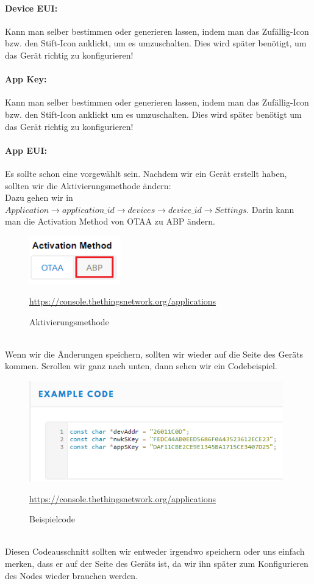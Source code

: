 \paragraph{Device EUI:} Kann man selber bestimmen oder generieren lassen, indem man das Zufällig-Icon bzw. den Stift-Icon anklickt, um es umzuschalten. Dies wird später benötigt, um das Gerät richtig zu konfigurieren!

\paragraph{App Key:} Kann man selber bestimmen oder generieren lassen, indem man das Zufällig-Icon bzw. den Stift-Icon anklickt um es umzuschalten. Dies wird später benötigt um das Gerät richtig zu konfigurieren!

\paragraph{App EUI:} Es sollte schon eine vorgewählt sein. Nachdem wir ein Gerät erstellt haben, sollten wir die Aktivierungsmethode ändern:\\
Dazu gehen wir in $Application \rightarrow application\_id \rightarrow devices \rightarrow device\_id \rightarrow Settings$. Darin kann man die Activation Method von OTAA zu ABP ändern.
\begin{figure}[ht]
    \center
    \includegraphics[width=4cm]{Bilder/lora-6.png}\\
    \caption{Aktivierungsmethode}
    \begin{center} \quelle\url{https://console.thethingsnetwork.org/applications} \end{center}
\end{figure}\\
Wenn wir die Änderungen speichern, sollten wir wieder auf die Seite des Geräts kommen. Scrollen wir ganz nach unten, dann sehen wir ein Codebeispiel.
\begin{figure}[ht]
    \center
    \includegraphics[width=11cm]{Bilder/lora-7.png}\\
    \caption{Beispielcode}
    \begin{center} \quelle\url{https://console.thethingsnetwork.org/applications} \end{center}
    \label{fig:beispielcode}
\end{figure}\\
Diesen Codeausschnitt sollten wir entweder irgendwo speichern oder uns einfach merken, dass er auf der Seite des Geräts ist, da wir ihn später zum Konfigurieren des Nodes wieder brauchen werden. 
